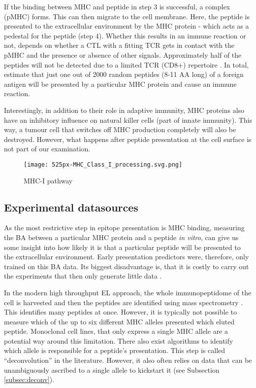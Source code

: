 \documentclass[msc,deptreport,ai]{infthesis} %
\begin{document}
		If the binding between \gls{MHC} and peptide in step 3 is successful, a complex (\gls{pMHC}) forms. This can then migrate to the cell membrane. Here, the peptide is presented to the extracellular environment by the \gls{MHC} protein - which acts as a pedestal for the peptide (step 4). Whether this results in an immune reaction or not, depends on whether a \gls{CTL} with a fitting \gls{TCR} gets in contact with the \gls{pMHC} and the presence or absence of other signals. Approximately half of the peptides will not be detected due to a limited \gls{TCR} (CD8+) repertoire \cite{yewdell_immunodominance_1999}. In total, \cite{yewdell_immunodominance_1999} estimate that just one out of 2000 random peptides (8-11 \gls{AA} long) of a foreign antigen will be presented by a particular \gls{MHC} protein and cause an immune reaction. 
		
		Interestingly, in addition to their role in adaptive immunity, \gls{MHC} proteins also have an inhibitory influence on natural killer cells \cite{mosaad_clinical_2015} (part of innate immunity). This way, a tumour cell that switches off \gls{MHC} production completely will also be destroyed. However, what happens after peptide presentation at the cell surface is not part of our examination.
	
		\begin{figure}
			\centering
			\texttt{[image: 525px-MHC\_Class\_I\_processing.svg.png]}
			\caption[MHCpathway]{\gls{MHC-I} pathway \cite{wikipedia_major_2021}}
			\label{MHCpathway}
		\end{figure}

	\subsection{Experimental datasources}
		As the most restrictive step in epitope presentation is \gls{MHC} binding, measuring the \gls{BA} between a particular \gls{MHC} protein and a peptide \textit{in vitro}, can give us some insight into how likely it is that a particular peptide will be presented to the extracellular environment. Early presentation predictors were, therefore, only trained on this \gls{BA} data. Its biggest disadvantage is, that it is costly to carry out the experiments that then only generate little data \cite{alvarez_nnalign_ma_2019}.

		In the modern high throughput \gls{EL} approach, the whole immunopeptidome of the cell is harvested and then the peptides are identified using mass spectrometry \cite{hunt_characterization_1992}. This identifies many peptides at once. However, it is typically not possible to measure which of the up to six different \gls{MHC} alleles presented which eluted peptide. Monoclonal cell lines, that only express a single \gls{MHC} allele are a potential way around this limitation. There also exist algorithms to identify which allele is responsible for a peptide's presentation. This step is called ``deconvolution'' in the literature. However, it  also often relies on data that can be unambiguously ascribed to a single allele to  kickstart it (see Subsection \ref{subsec:deconv}).
\end{document}
